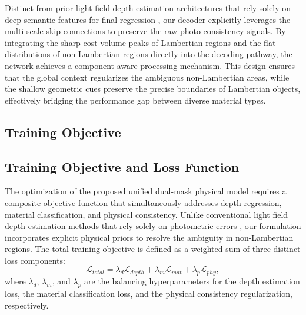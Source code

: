\documentclass[lettersize,journal]{IEEEtran}
\begin{document}
Distinct from prior light field depth estimation architectures that rely solely on deep semantic features for final regression \cite{heber2018, li2021}, our decoder explicitly leverages the multi-scale skip connections to preserve the raw photo-consistency signals. By integrating the sharp cost volume peaks of Lambertian regions and the flat distributions of non-Lambertian regions directly into the decoding pathway, the network achieves a component-aware processing mechanism. This design ensures that the global context regularizes the ambiguous non-Lambertian areas, while the shallow geometric cues preserve the precise boundaries of Lambertian objects, effectively bridging the performance gap between diverse material types.

\subsection{Training Objective}

\subsection{Training Objective and Loss Function}

The optimization of the proposed unified dual-mask physical model requires a composite objective function that simultaneously addresses depth regression, material classification, and physical consistency. Unlike conventional light field depth estimation methods that rely solely on photometric errors \cite{eigen2014}, our formulation incorporates explicit physical priors to resolve the ambiguity in non-Lambertian regions. The total training objective is defined as a weighted sum of three distinct loss components:
\begin{equation}
\mathcal{L}_{total} = \lambda_{d} \mathcal{L}_{depth} + \lambda_{m} \mathcal{L}_{mat} + \lambda_{p} \mathcal{L}_{phy},
\end{equation}
where $\lambda_{d}$, $\lambda_{m}$, and $\lambda_{p}$ are the balancing hyperparameters for the depth estimation loss, the material classification loss, and the physical consistency regularization, respectively.
\end{document}
